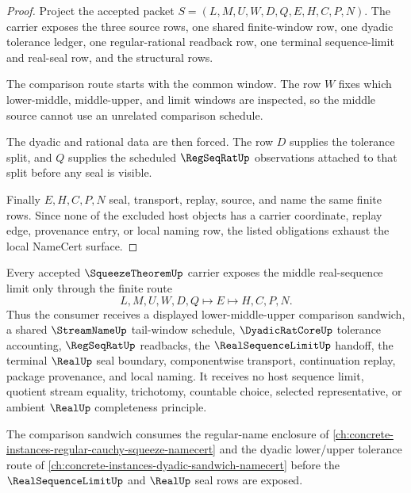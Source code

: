 \begin{proof}
Project the accepted packet $S=(L,M,U,W,D,Q,E,H,C,P,N)$. The carrier exposes the three source rows, one shared finite-window row, one dyadic tolerance ledger, one regular-rational readback row, one terminal sequence-limit and real-seal row, and the structural rows.

The comparison route starts with the common window. The row $W$ fixes which lower-middle, middle-upper, and limit windows are inspected, so the middle source cannot use an unrelated comparison schedule.

The dyadic and rational data are then forced. The row $D$ supplies the tolerance split, and $Q$ supplies the scheduled $\RegSeqRatUp$ observations attached to that split before any seal is visible.

Finally $E,H,C,P,N$ seal, transport, replay, source, and name the same finite rows. Since none of the excluded host objects has a carrier coordinate, replay edge, provenance entry, or local naming row, the listed obligations exhaust the local NameCert surface.
\end{proof}

\begin{theorem}
\label{thm:squeeze-theorem-comparison-sandwich}
Every accepted $\SqueezeTheoremUp$ carrier exposes the middle real-sequence limit only through the finite route
$$
L,M,U,W,D,Q \longmapsto E \longmapsto H,C,P,N .
$$
Thus the consumer receives a displayed lower-middle-upper comparison sandwich, a shared $\StreamNameUp$ tail-window schedule, $\DyadicRatCoreUp$ tolerance accounting, $\RegSeqRatUp$ readbacks, the $\RealSequenceLimitUp$ handoff, the terminal $\RealUp$ seal boundary, componentwise transport, continuation replay, package provenance, and local naming. It receives no host sequence limit, quotient stream equality, trichotomy, countable choice, selected representative, or ambient $\RealUp$ completeness principle.
\end{theorem}

The comparison sandwich consumes the regular-name enclosure of \autoref{ch:concrete-instances-regular-cauchy-squeeze-namecert} and the dyadic lower/upper tolerance route of \autoref{ch:concrete-instances-dyadic-sandwich-namecert} before the $\RealSequenceLimitUp$ and $\RealUp$ seal rows are exposed.

